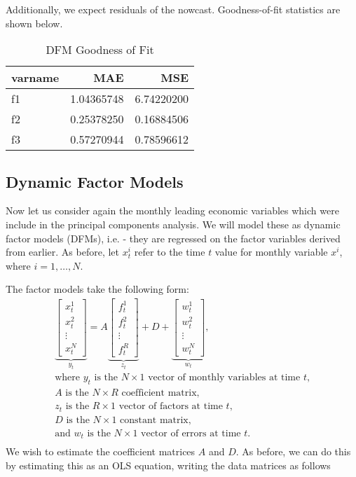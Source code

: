 \documentclass[11pt, letterpaper]{article}\usepackage[]{graphicx}\usepackage[]{color}
\begin{document}
Additionally, we expect residuals of the nowcast. Goodness-of-fit statistics are shown below.
\begin{table}[H]
\centering
\begingroup\footnotesize
\begin{tabular}{lrr}
  \hline
varname & MAE & MSE \\ 
  \hline
f1 & 1.04365748 & 6.74220200 \\ 
  f2 & 0.25378250 & 0.16884506 \\ 
  f3 & 0.57270944 & 0.78596612 \\ 
   \hline
\end{tabular}
\endgroup
\caption{DFM Goodness of Fit} 
\end{table}




\subsection{Dynamic Factor Models}
Now let us consider again the monthly leading economic variables which were include in the principal components analysis. We will model these as dynamic factor models (DFMs), i.e. - they are regressed on the factor variables derived from earlier. As before, let $x^i_t$ refer to the time $t$ value for monthly variable $x^i$, where $i = 1, \dots, N$.

The factor models take the following form:
\begin{align*}
\underbrace{\begin{bmatrix}
	x^1_t\\
	x^2_t\\
	\vdots \\
	x^N_t
\end{bmatrix}}_{y_t}
=
A
\underbrace{\begin{bmatrix}
	f^1_{t}\\
	f^2_{t}\\
	\vdots \\
	f^R_{t}
\end{bmatrix}}_{z_t}
+
D 
+
\underbrace{\begin{bmatrix}
	w^1_t\\
	w^2_t\\
	\vdots\\
	w^N_t
\end{bmatrix}}_{w_t},\\
\text{where $y_t$ is the $N \times 1$ vector of monthly variables at time $t$,}\\
\text{$A$ is the $N \times R$ coefficient matrix,}\\
\text{$z_t$ is the $R \times 1$ vector of factors at time $t$,}\\
\text{$D$ is the $N \times 1$ constant matrix,}\\
\text{and $w_t$ is the $N \times 1$ vector of errors at time $t$.}\\
\end{align*}
We wish to estimate the coefficient matrices $A$ and $D$. As before, we can do this by estimating this as an OLS equation, writing the data matrices as follows
\end{document}
